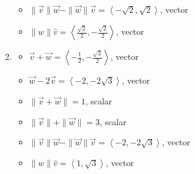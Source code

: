 \begin{enumerate}
\begin{multicols}{2}
\begin{itemize}
\end{itemize}

\end{multicols}

\begin{multicols}{2}

\begin{itemize}

\item $\| \vec{v} \| \vec{w} - \| \vec{w} \| \vec{v}  = \left<-\sqrt{2},\sqrt{2}\right>$, vector
\item $\|w\| \hat{v}= \left<\frac{\sqrt{2}}{2}, -\frac{\sqrt{2}}{2} \right>$, vector

\end{itemize}

\end{multicols}

\pagebreak

\item  

\begin{multicols}{2}

\begin{itemize}

\item  $\vec{v} + \vec{w} = \left<-\frac{1}{2}, -\frac{\sqrt{3}}{2}\right> $, vector
\item  $\vec{w}  - 2\vec{v}  = \left<-2, -2\sqrt{3} \right>$, vector

\end{itemize}

\end{multicols}

\begin{multicols}{2}

\begin{itemize}

\item $\| \vec{v} + \vec{w} \| = 1$, scalar
\item  $\| \vec{v} \| + \| \vec{w}\| = 3$, scalar

\end{itemize}

\end{multicols}

\begin{multicols}{2}

\begin{itemize}

\item $\| \vec{v} \| \vec{w} - \| \vec{w} \| \vec{v}  = \left<-2,-2\sqrt{3}\right>$, vector
\item $\|w\| \hat{v}= \left<1, \sqrt{3} \right>$, vector


\end{itemize}
\end{multicols}
\end{enumerate}

